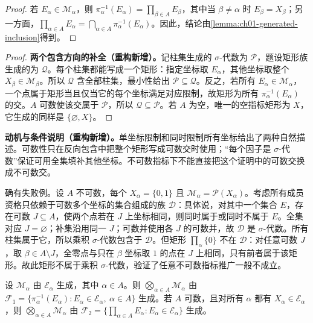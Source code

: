 \documentclass[../../main.tex]{subfiles}%
\begin{document}
\begin{proof}
若 $E_\alpha\in\mathscr{M}_\alpha$，则 $\pi_\alpha^{-1}(E_\alpha)=\prod_{\beta\in A}E_\beta$，其中当 $\beta\ne\alpha$ 时 $E_\beta=X_\beta$；另一方面，$\prod_{\alpha\in A}E_\alpha=\bigcap_{\alpha\in A}\pi_\alpha^{-1}(E_\alpha)$。因此，结论由\cref{lemma:ch01-generated-inclusion}得到。
\end{proof}
\begin{proof}
\textbf{两个包含方向的补全（重构新增）。}记柱集生成的 $\sigma$-代数为 $\mathscr{P}$，题设矩形族生成的为 $\mathscr{Q}$。每个柱集都能写成一个矩形：指定坐标取 $E_\alpha$，其他坐标取整个 $X_\beta\in\mathscr{M}_\beta$。所以 $\mathscr{Q}$ 含全部柱集，最小性给出 $\mathscr{P}\subseteq\mathscr{Q}$。反之，若所有 $E_\alpha\in\mathscr{M}_\alpha$，一个点属于矩形当且仅当它的每个坐标满足对应限制，故矩形为所有 $\pi_\alpha^{-1}(E_\alpha)$ 的交。$A$ 可数使该交属于 $\mathscr{P}$，所以 $\mathscr{Q}\subseteq\mathscr{P}$。若 $A$ 为空，唯一的空指标矩形为 $X$，它生成的同样是 $\{\varnothing,X\}$。
\end{proof}
\begin{remark}
\textbf{动机与条件说明（重构新增）。}单坐标限制和同时限制所有坐标给出了两种自然描述。可数性只在反向包含中把整个矩形写成可数交时使用；“每个因子是 $\sigma$-代数”保证可用全集填补其他坐标。不可数指标下不能直接把这个证明中的可数交换成不可数交。

确有失败例。设 $A$ 不可数，每个 $X_\alpha=\{0,1\}$ 且 $\mathscr{M}_\alpha=\mathscr{P}(X_\alpha)$。考虑所有成员资格只依赖于可数多个坐标的集合组成的族 $\mathscr{D}$：具体说，对其中一个集合 $E$，存在可数 $J\subseteq A$，使两个点若在 $J$ 上坐标相同，则同时属于或同时不属于 $E$。全集对应 $J=\varnothing$；补集沿用同一 $J$；可数并使用各 $J$ 的可数并，故 $\mathscr{D}$ 是 $\sigma$-代数。所有柱集属于它，所以乘积 $\sigma$-代数包含于 $\mathscr{D}$。但矩形 $\prod_\alpha\{0\}$ 不在 $\mathscr{D}$：对任意可数 $J$，取 $\beta\in A\setminus J$，全零点与只在 $\beta$ 坐标取 $1$ 的点在 $J$ 上相同，只有前者属于该矩形。故此矩形不属于乘积 $\sigma$-代数，验证了任意不可数指标推广一般不成立。
\end{remark}


\begin{proposition}\label{proposition:ch01-product-generating-families}
设 $\mathscr{M}_\alpha$ 由 $\mathscr{E}_\alpha$ 生成，其中 $\alpha\in A$。则 $\bigotimes_{\alpha\in A}\mathscr{M}_\alpha$ 由 $\mathscr{F}_1=\{\pi_\alpha^{-1}(E_\alpha):E_\alpha\in\mathscr{E}_\alpha,\ \alpha\in A\}$ 生成。若 $A$ 可数，且对所有 $\alpha$ 都有 $X_\alpha\in\mathscr{E}_\alpha$，则 $\bigotimes_{\alpha\in A}\mathscr{M}_\alpha$ 由 $\mathscr{F}_2=\{\prod_{\alpha\in A}E_\alpha:E_\alpha\in\mathscr{E}_\alpha\}$ 生成。
\end{proposition}
\end{document}
